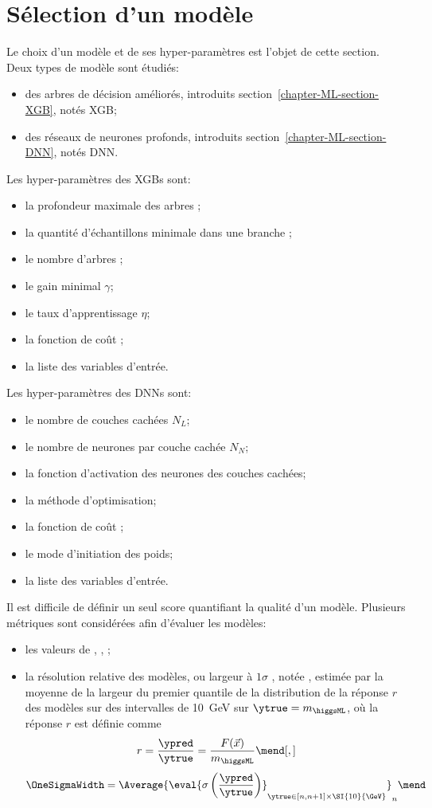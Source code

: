\section{Sélection d'un modèle}\label{chapter-ML-section-hyperparameters}
Le choix d'un modèle et de ses hyper-paramètres est l'objet de cette section.
Deux types de modèle sont étudiés:
\begin{itemize}
\item des arbres de décision améliorés, introduits section~\ref{chapter-ML-section-XGB}, notés XGB;
\item des réseaux de neurones profonds, introduits section~\ref{chapter-ML-section-DNN}, notés DNN.
\end{itemize}
\par
Les hyper-paramètres des XGBs sont:
\begin{itemize}
\item la profondeur maximale des arbres \MaxDepth;
\item la quantité d'échantillons minimale dans une branche \MinChildWeight;
\item le nombre d'arbres \Nestimators;
\item le gain minimal $\gamma$;
\item le taux d'apprentissage $\eta$;
\item la fonction de coût \Loss;
\item la liste des variables d'entrée.
\end{itemize}
Les hyper-paramètres des DNNs sont:
\begin{itemize}
\item le nombre de couches cachées $N_L$;
\item le nombre de neurones par couche cachée $N_N$;
\item la fonction d'activation des neurones des couches cachées;
\item la méthode d'optimisation;
\item la fonction de coût \Loss;
\item le mode d'initiation des poids;
\item la liste des variables d'entrée.
\end{itemize}
\par
Il est difficile de définir un seul score quantifiant la qualité d'un modèle.
Plusieurs métriques sont considérées afin d'évaluer les modèles:
\begin{itemize}
\item les valeurs de
\LossMSE,
\LossMAE,
\LossMAPE;
\item la résolution relative des modèles,
ou \og largeur à $1\sigma$ \fg,
notée \OneSigmaWidth,
estimée par
la moyenne
de
la largeur du premier quantile de la distribution de la réponse $r$ des modèles
sur des intervalles de \SI{10}{\GeV} sur $\ytrue=m_{\higgsML}$,
où la réponse $r$ est définie comme
\begin{equation}
r = \frac{\ypred}{\ytrue} = \frac{F(\vec{x})}{m_{\higgsML}}
\mend[,]
\end{equation}
\ie
\begin{equation}
\OneSigmaWidth = \Average{\eval{\sigma\left(\frac{\ypred}{\ytrue}\right)}_{\ytrue\in [n, n+1]\times\SI{10}{\GeV}}}_n
\mend
\end{equation}
\end{itemize}
